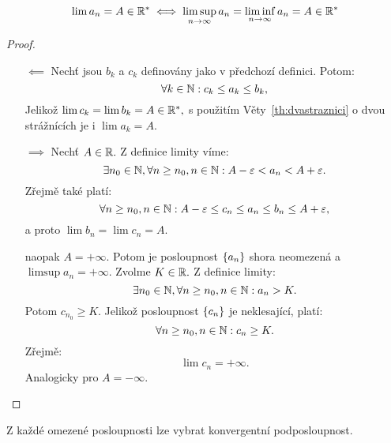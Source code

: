 \begin{theorem}
    \label{th:limitalimsupliminf}
    $$\lim a_n = A \in \mathbb{R}^* \iff \limsup_{n\to\infty} a_n = 
    \liminf_{n\to\infty} a_n = A \in \mathbb{R}^*$$
\end{theorem}

\begin{proof}
    \leavevmode
    \begin{itemize}
        \item[$\impliedby$] Nechť jsou $b_k$ a $c_k$ definovány jako v předchozí 
            definici. Potom:
            $$\forall k \in \mathbb{N}: c_k \leq a_k \leq b_k,$$
            Jelikož $\lim c_k = \lim b_k = A \in \mathbb{R}^*,$ s použitím 
            Věty~\ref{th:dvastraznici} o dvou strážnících je i 
            $\lim a_k = A.$
        \item[$\implies$] Nechť $A \in \mathbb{R}.$ Z definice limity víme:
            $$\exists n_0 \in \mathbb{N}, \forall n \geq n_0, n \in \mathbb{N}: A - \varepsilon < a_n < A + \varepsilon.$$
            Zřejmě také platí:
                $$\forall n \geq n_0, n\in\mathbb{N}: A -\varepsilon \leq c_n \leq a_n \leq b_n \leq A + \varepsilon,$$
            a proto $\lim b_n = \lim c_n = A.$

            \Necht naopak $A = +\infty.$ Potom je posloupnost $\left\{a_n\right\}$ shora 
            neomezená a $\limsup a_n = +\infty.$
            Zvolme $K \in \mathbb{R}.$ Z definice limity:
            $$\exists n_0 \in \mathbb{N}, \forall n \geq n_0, n\in\mathbb{N}: a_n > K.$$
            Potom $c_{n_0} \geq K.$ Jelikož posloupnost $\left\{c_n\right\}$ je neklesající,
            platí:
            $$\forall n \geq n_0, n \in \mathbb{N}: c_n \geq K.$$ 
            Zřejmě:
            $$ \lim c_n = +\infty.$$
            Analogicky pro $A = -\infty.$
    \end{itemize}
\end{proof}

\begin{theorem}
    \label{th:bolzanoweierstrass}
    Z každé omezené posloupnosti lze vybrat konvergentní podposloupnost.
\end{theorem}

